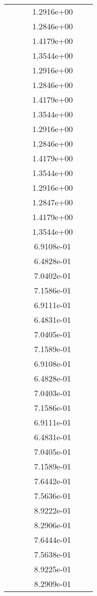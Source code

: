 \begin{xltabular}{\textwidth}{r|rS[table-format=1.3e+2]S[table-format=1.4e+2]S[table-format=1.4e+2]S[table-format=-1.5]}
&  &  & 1.2916e+00 & & \\
&  &  & 1.2846e+00 & & \\
&  &  & 1.4179e+00 & & \\
&  &  & 1.3544e+00 & & \\
&  &  & 1.2916e+00 & & \\
&  &  & 1.2846e+00 & & \\
&  &  & 1.4179e+00 & & \\
&  &  & 1.3544e+00 & & \\
&  &  & 1.2916e+00 & & \\
&  &  & 1.2846e+00 & & \\
&  &  & 1.4179e+00 & & \\
&  &  & 1.3544e+00 & & \\
&  &  & 1.2916e+00 & & \\
&  &  & 1.2847e+00 & & \\
&  &  & 1.4179e+00 & & \\
&  &  & 1.3544e+00 & & \\
&  &  & 6.9108e-01 & & \\
&  &  & 6.4828e-01 & & \\
&  &  & 7.0402e-01 & & \\
&  &  & 7.1586e-01 & & \\
&  &  & 6.9111e-01 & & \\
&  &  & 6.4831e-01 & & \\
&  &  & 7.0405e-01 & & \\
&  &  & 7.1589e-01 & & \\
&  &  & 6.9108e-01 & & \\
&  &  & 6.4828e-01 & & \\
&  &  & 7.0403e-01 & & \\
&  &  & 7.1586e-01 & & \\
&  &  & 6.9111e-01 & & \\
&  &  & 6.4831e-01 & & \\
&  &  & 7.0405e-01 & & \\
&  &  & 7.1589e-01 & & \\
&  &  & 7.6442e-01 & & \\
&  &  & 7.5636e-01 & & \\
&  &  & 8.9222e-01 & & \\
&  &  & 8.2906e-01 & & \\
&  &  & 7.6444e-01 & & \\
&  &  & 7.5638e-01 & & \\
&  &  & 8.9225e-01 & & \\
&  &  & 8.2909e-01 & & \\

\end{xltabular}
